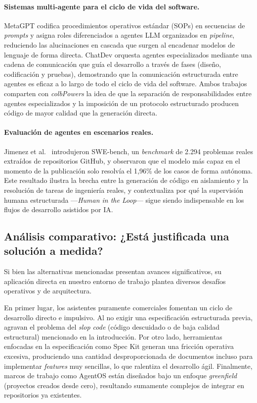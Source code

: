 \documentclass[11pt, letterpaper]{article}
\begin{document}
\paragraph{Sistemas multi-agente para el ciclo de vida del software.}
MetaGPT \cite{hong2023metagpt} codifica procedimientos operativos estándar (SOPs) en secuencias de \textit{prompts} y asigna roles diferenciados a agentes LLM organizados en \textit{pipeline}, reduciendo las alucinaciones en cascada que surgen al encadenar modelos de lenguaje de forma directa. ChatDev \cite{qian2024chatdev} orquesta agentes especializados mediante una cadena de comunicación que guía el desarrollo a través de fases (diseño, codificación y pruebas), demostrando que la comunicación estructurada entre agentes es eficaz a lo largo de todo el ciclo de vida del software. Ambos trabajos comparten con \textit{colbPowers} la idea de que la separación de responsabilidades entre agentes especializados y la imposición de un protocolo estructurado producen código de mayor calidad que la generación directa.

\paragraph{Evaluación de agentes en escenarios reales.}
Jimenez et al.\ \cite{jimenez2024swebench} introdujeron SWE-bench, un \textit{benchmark} de 2.294 problemas reales extraídos de repositorios GitHub, y observaron que el modelo más capaz en el momento de la publicación solo resolvía el 1,96\% de los casos de forma autónoma. Este resultado ilustra la brecha entre la generación de código en aislamiento y la resolución de tareas de ingeniería reales, y contextualiza por qué la supervisión humana estructurada ---\textit{Human in the Loop}--- sigue siendo indispensable en los flujos de desarrollo asistidos por IA.

\subsection{Análisis comparativo: ¿Está justificada una solución a medida?}
\label{sec:analisis_comparativo}

Si bien las alternativas mencionadas presentan avances significativos, su aplicación directa en nuestro entorno de trabajo plantea diversos desafíos operativos y de arquitectura. 

En primer lugar, los asistentes puramente comerciales fomentan un ciclo de desarrollo directo e impulsivo. Al no exigir una especificación estructurada previa, agravan el problema del \textit{slop code} (código descuidado o de baja calidad estructural) mencionado en la introducción. Por otro lado, herramientas enfocadas en la especificación como Spec Kit generan una fricción operativa excesiva, produciendo una cantidad desproporcionada de documentos incluso para implementar \textit{features} muy sencillas, lo que ralentiza el desarrollo ágil. Finalmente, marcos de trabajo como AgentOS están diseñados bajo un enfoque \textit{greenfield} (proyectos creados desde cero), resultando sumamente complejos de integrar en repositorios ya existentes.
\end{document}
